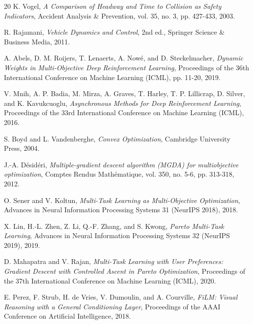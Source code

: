 \documentclass[12pt, letterpaper]{article}
\begin{document}
\begin{thebibliography}{20}
K. Vogel,
\textit{A Comparison of Headway and Time to Collision as Safety Indicators},
Accident Analysis \& Prevention, vol. 35, no. 3, pp. 427-433, 2003.

R. Rajamani,
\textit{Vehicle Dynamics and Control}, 2nd ed.,
Springer Science \& Business Media, 2011.

A. Abels, D. M. Roijers, T. Lenaerts, A. Nowé, and D. Steckelmacher,
\textit{Dynamic Weights in Multi-Objective Deep Reinforcement Learning},
Proceedings of the 36th International Conference on Machine Learning (ICML), pp. 11-20, 2019.

V. Mnih, A. P. Badia, M. Mirza, A. Graves, T. Harley, T. P. Lillicrap, D. Silver, and K. Kavukcuoglu,
\textit{Asynchronous Methods for Deep Reinforcement Learning},
Proceedings of the 33rd International Conference on Machine Learning (ICML), 2016.

S. Boyd and L. Vandenberghe,
\textit{Convex Optimization},
Cambridge University Press, 2004.

J.-A. Désidéri,
\textit{Multiple-gradient descent algorithm (MGDA) for multiobjective optimization},
Comptes Rendus Mathématique, vol. 350, no. 5-6, pp. 313-318, 2012.

O. Sener and V. Koltun,
\textit{Multi-Task Learning as Multi-Objective Optimization},
Advances in Neural Information Processing Systems 31 (NeurIPS 2018), 2018.

X. Lin, H.-L. Zhen, Z. Li, Q.-F. Zhang, and S. Kwong,
\textit{Pareto Multi-Task Learning},
Advances in Neural Information Processing Systems 32 (NeurIPS 2019), 2019.

D. Mahapatra and V. Rajan,
\textit{Multi-Task Learning with User Preferences: Gradient Descent with Controlled Ascent in Pareto Optimization},
Proceedings of the 37th International Conference on Machine Learning (ICML), 2020.

E. Perez, F. Strub, H. de Vries, V. Dumoulin, and A. Courville,
\textit{FiLM: Visual Reasoning with a General Conditioning Layer},
Proceedings of the AAAI Conference on Artificial Intelligence, 2018.

\end{thebibliography}
\end{document}
